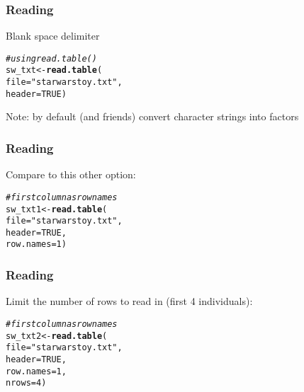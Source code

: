 \documentclass[12pt]{beamer}\usepackage[]{graphicx}\usepackage[]{color}
\makeatletter
\newcommand{\hlnum}[1]{\textcolor[rgb]{0.686,0.059,0.569}{#1}}%
\newcommand{\hlstr}[1]{\textcolor[rgb]{0.192,0.494,0.8}{#1}}%
\newcommand{\hlcom}[1]{\textcolor[rgb]{0.678,0.584,0.686}{\textit{#1}}}%
\newcommand{\hlstd}[1]{\textcolor[rgb]{0.345,0.345,0.345}{#1}}%
\newcommand{\hlkwb}[1]{\textcolor[rgb]{0.69,0.353,0.396}{#1}}%
\newcommand{\hlkwc}[1]{\textcolor[rgb]{0.333,0.667,0.333}{#1}}%
\newcommand{\hlkwd}[1]{\textcolor[rgb]{0.737,0.353,0.396}{\textbf{#1}}}%
\newenvironment{kframe}{%
 \def\at@end@of@kframe{}%
 \ifinner\ifhmode%
  \def\at@end@of@kframe{\end{minipage}}%
  \begin{minipage}{\columnwidth}%
 \fi\fi%
 \def\FrameCommand##1{\hskip\@totalleftmargin \hskip-\fboxsep
 \colorbox{shadecolor}{##1}\hskip-\fboxsep
     \hskip-\linewidth \hskip-\@totalleftmargin \hskip\columnwidth}%
 \MakeFramed {\advance\hsize-\width
   \@totalleftmargin\z@ \linewidth\hsize
   \@setminipage}}%
 {\par\unskip\endMakeFramed%
 \at@end@of@kframe}
\newenvironment{knitrout}{}{} %
\makeatother
\begin{document}
\begin{frame}[fragile]
\frametitle{Reading }

Blank space delimiter 

\begin{knitrout}\footnotesize
{}\color{fgcolor}\begin{kframe}
\begin{alltt}
\hlcom{# using read.table()}
\hlstd{sw_txt} \hlkwb{<-} \hlkwd{read.table}\hlstd{(}
  \hlkwc{file} \hlstd{=} \hlstr{"starwarstoy.txt"}\hlstd{,}
  \hlkwc{header} \hlstd{=} \hlnum{TRUE}\hlstd{)}
\end{alltt}
\end{kframe}
\end{knitrout}

Note: by default  (and friends) convert character strings into factors

\end{frame}


\begin{frame}[fragile]
\frametitle{Reading }

Compare to this other option:

\begin{knitrout}\footnotesize
{}\color{fgcolor}\begin{kframe}
\begin{alltt}
\hlcom{# first column as row names}
\hlstd{sw_txt1} \hlkwb{<-} \hlkwd{read.table}\hlstd{(}
  \hlkwc{file} \hlstd{=} \hlstr{"starwarstoy.txt"}\hlstd{,}
  \hlkwc{header} \hlstd{=} \hlnum{TRUE}\hlstd{,}
  \hlkwc{row.names} \hlstd{=} \hlnum{1}\hlstd{)}
\end{alltt}
\end{kframe}
\end{knitrout}

\end{frame}


\begin{frame}[fragile]
\frametitle{Reading }

Limit the number of rows to read in (first 4 individuals):

\begin{knitrout}\footnotesize
{}\color{fgcolor}\begin{kframe}
\begin{alltt}
\hlcom{# first column as row names}
\hlstd{sw_txt2} \hlkwb{<-} \hlkwd{read.table}\hlstd{(}
  \hlkwc{file} \hlstd{=} \hlstr{"starwarstoy.txt"}\hlstd{,}
  \hlkwc{header} \hlstd{=} \hlnum{TRUE}\hlstd{,}
  \hlkwc{row.names} \hlstd{=} \hlnum{1}\hlstd{,}
  \hlkwc{nrows} \hlstd{=} \hlnum{4}\hlstd{)}
\end{alltt}
\end{kframe}
\end{knitrout}

\end{frame}
\end{document}
